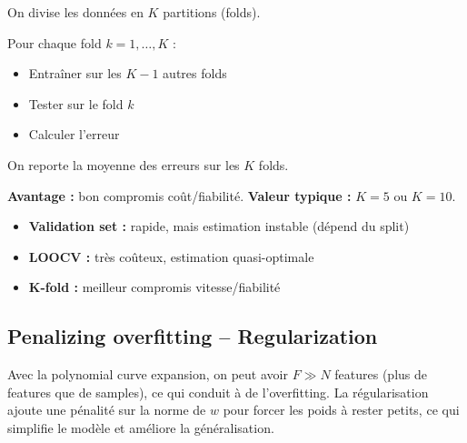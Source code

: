 \documentclass[11pt,a4paper,openany]{book}
\begin{document}
\begin{propbox}[title=K-fold cross validation]
On divise les données en $K$ partitions (folds).

\vspace{0.3cm}

Pour chaque fold $k = 1, \dots, K$ :
\begin{itemize}
    \item Entraîner sur les $K-1$ autres folds
    \item Tester sur le fold $k$
    \item Calculer l'erreur
\end{itemize}

\vspace{0.3cm}

On reporte la moyenne des erreurs sur les $K$ folds.

\textbf{Avantage :} bon compromis coût/fiabilité. \textbf{Valeur typique :} $K = 5$ ou $K = 10$.
\end{propbox}

\vspace{0.8cm}

\begin{rembox}[title=Comparison]
\begin{itemize}
    \item \textbf{Validation set :} rapide, mais estimation instable (dépend du split)
    \item \textbf{LOOCV :} très coûteux, estimation quasi-optimale
    \item \textbf{K-fold :} meilleur compromis vitesse/fiabilité
\end{itemize}
\end{rembox}

\vspace{8cm}

\subsection{Penalizing overfitting -- Regularization}

\begin{rembox}[title=Pourquoi régulariser ?]
Avec la polynomial curve expansion, on peut avoir $F \gg N$ features (plus de features que de samples), ce qui conduit à de l'overfitting. La régularisation ajoute une pénalité sur la norme de $w$ pour forcer les poids à rester petits, ce qui simplifie le modèle et améliore la généralisation.
\end{rembox}
\end{document}
